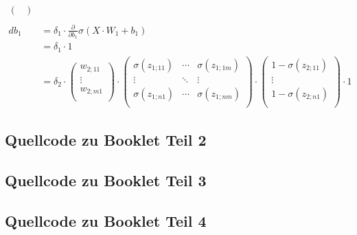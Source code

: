 \begin{align*}
\begin{pmatrix}
                                                                                        \end{pmatrix} \\\\
    db_{1} &= \delta_{1} \cdot \frac{\partial}{\partial b_{1}}\sigma(X\cdot W_{1}+b_{1})\\
    &= \delta_{1} \cdot 1\\
    &= \delta_{2} \cdot \begin{pmatrix}
                        w_{2;11} \\
                        \vdots \\
                        w_{2;m1} \\
                        \end{pmatrix} \cdot \begin{pmatrix}
                                            \sigma (z_{1;11})& \cdots & \sigma(z_{1;1m}) \\
                                            \vdots & \ddots &\vdots\\
                                            \sigma (z_{1;n1}) & \cdots & \sigma (z_{1;nm})  \\
                                            \end{pmatrix} \cdot \begin{pmatrix}
                                                                1-\sigma (z_{2;11}) \\
                                                                \vdots \\
                                                                1-\sigma (z_{2;n1})  \\
                                                                \end{pmatrix} \cdot 1
\end{align*}
\subsection{Quellcode zu Booklet Teil 2}
\pagebreak
\subsection{Quellcode zu Booklet Teil 3}
\pagebreak
\subsection{Quellcode zu Booklet Teil 4}